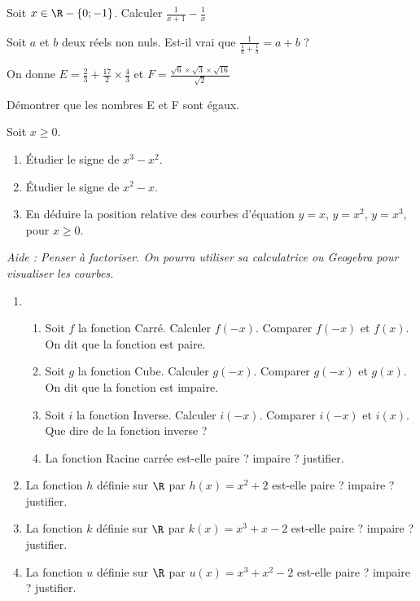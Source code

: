 \documentclass[10pt]{article}
\begin{document}

\begin{minipage}{0.45\linewidth}

Soit $x \in \R-\left\lbrace 0;-1\right\rbrace $.  Calculer $\frac{1}{x+1}-\frac{1}{x}$

 \end{minipage}
\begin{minipage}{0.55\linewidth}


Soit $a$ et $b$ deux réels non nuls. Est-il vrai que $\frac{1}{\frac{1}{a}+\frac{1}{b}}=a+b$ ?
 \end{minipage}




On donne $E = \frac{2}{3}+\frac{17}{2} \times \frac{4}{3}$ et $F = \frac{\sqrt 6 \times \sqrt 3\times \sqrt{16} }{\sqrt 2}  $ 
 
Démontrer que les nombres E et F sont égaux.




Soit $x \geq 0$.
\begin{enumerate}
\item Étudier le signe de $x^3-x^2$.
\item Étudier le signe de $x^2-x$.
\item En déduire la position relative des courbes d’équation $y = x$, $y = x^2$, $y = x^3$, pour $x \geq 0$.
\end{enumerate}
\textit{Aide : Penser à factoriser. On pourra utiliser sa calculatrice ou Geogebra pour visualiser les courbes.}



\begin{enumerate}
\item 
\begin{enumerate}
\item Soit $f$ la fonction Carré. Calculer $f(-x)$. Comparer $f(-x)$ et $f(x)$. On dit que la fonction est paire.
\item Soit $g$ la fonction Cube. Calculer $g(-x)$. Comparer $g(-x)$ et $g(x)$. On dit que la fonction est impaire.
\item Soit $i$ la fonction Inverse. Calculer $i(-x)$. Comparer $i(-x)$ et $i(x)$. Que dire de la fonction inverse ?
\item La fonction Racine carrée est-elle paire ? impaire ? justifier.
\end{enumerate}
\item La fonction $h$ définie sur $\R$ par $h(x)=x^2+2$ est-elle paire ? impaire ? justifier.
\item La fonction $k$ définie sur $\R$ par $k(x)=x^3+x-2$ est-elle paire ? impaire ? justifier.
\item La fonction $u$ définie sur $\R$ par $u(x)=x^3+x^2-2$ est-elle paire ? impaire ? justifier.
\end{enumerate}
 
\end{document}
